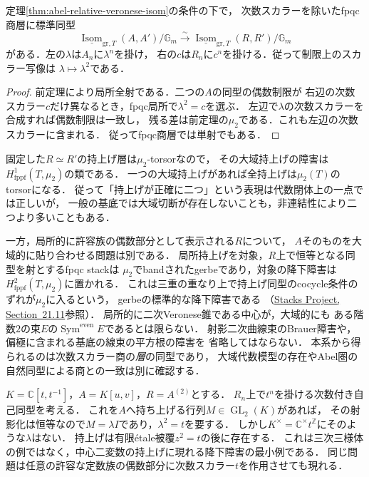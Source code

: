 \begin{corollary}[次数スカラーを除いた同型層]
\label{cor:abel-projective-veronese-isom}
定理\ref{thm:abel-relative-veronese-isom}の条件の下で，
次数スカラーを除いたfpqc商層に標準同型
\begin{equation}\label{eq:abel-projective-isom-sheaf}
 \underline{\operatorname{Isom}}_{\mathrm{gr},T}(A,A')/\mathbb G_m
   \xrightarrow{\sim}
 \underline{\operatorname{Isom}}_{\mathrm{gr},T}(R,R')/\mathbb G_m
\end{equation}
がある．左の$\lambda$は$A_n$に$\lambda^n$を掛け，
右の$c$は$R_n$に$c^n$を掛ける．従って制限上のスカラー写像は
$\lambda\mapsto\lambda^2$である．
\end{corollary}
\begin{proof}
前定理により局所全射である．二つの$A$の同型の偶数制限が
右辺の次数スカラー$c$だけ異なるとき，fpqc局所で$\lambda^2=c$を選ぶ．
左辺で$\lambda$の次数スカラーを合成すれば偶数制限は一致し，
残る差は前定理の$\mu_2$である．これも左辺の次数スカラーに含まれる．
従ってfpqc商層では単射でもある．
\end{proof}

\begin{remark}[同型と対象の降下障害を区別する]
\label{rem:abel-veronese-descent-obstruction}
固定した$R\simeq R'$の持上げ層は$\mu_2$-torsorなので，
その大域持上げの障害は$H^1_{\mathrm{fppf}}(T,\mu_2)$の類である．
一つの大域持上げがあれば全持上げは$\mu_2(T)$のtorsorになる．
従って「持上げが正確に二つ」という表現は代数閉体上の一点では正しいが，
一般の基底では大域切断が存在しないことも，非連結性により二つより多いこともある．

一方，局所的に許容族の偶数部分として表示される$R$について，
$A$そのものを大域的に貼り合わせる問題は別である．
局所持上げを対象，$R$上で恒等となる同型を射とするfpqc stackは
$\mu_2$でbandされたgerbeであり，対象の降下障害は
$H^2_{\mathrm{fppf}}(T,\mu_2)$に置かれる．
これは三重の重なり上で持上げ同型のcocycle条件のずれが$\mu_2$に入るという，
gerbeの標準的な降下障害である
（\href{https://stacks.math.columbia.edu/tag/0CJZ}{Stacks Project, Section~21.11}参照）．
局所的に二次Veronese錐である中心が，大域的にも
ある階数$2$の束$E$の$\operatorname{Sym}^{\mathrm{even}}E$であるとは限らない．
射影二次曲線束のBrauer障害や，偏極に含まれる基底の線束の平方根の障害を
省略してはならない．
本系から得られるのは次数スカラー商の\emph{層}の同型であり，
大域代数模型の存在やAbel圏の自然同型による商との一致は別に確認する．
\end{remark}

\begin{example}[複素基底でも大域持上げがない同型]
\label{ex:abel-veronese-nonsquare}
$K=\mathbb C[t,t^{-1}]$，$A=K[u,v]$，$R=A^{(2)}$とする．
$R_n$上で$t^n$を掛ける次数付き自己同型を考える．
これを$A$へ持ち上げる行列$M\in\operatorname{GL}_2(K)$があれば，
その射影化は恒等なので$M=\lambda I$であり，$\lambda^2=t$を要する．
しかし$K^\times=\mathbb C^\times t^{\mathbb Z}$にそのような$\lambda$はない．
持上げは有限\'etale被覆$z^2=t$の後に存在する．
これは三次三様体の例ではなく，中心二変数の持上げに現れる降下障害の最小例である．
同じ問題は任意の許容な定数族の偶数部分に次数スカラー$t$を作用させても現れる．
\end{example}

